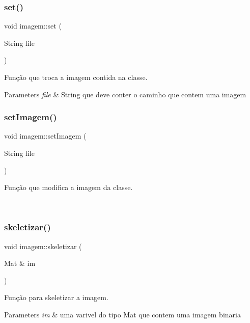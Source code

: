 \subsubsection{\texorpdfstring{set()}{set()}}
{\footnotesize\ttfamily void imagem\+::set (\begin{DoxyParamCaption}\item[{String}]{file }\end{DoxyParamCaption})}



Função que troca a imagem contida na classe. 


\begin{DoxyParams}{Parameters}
{\em file} & String que deve conter o caminho que contem uma imagem \\
\hline
\end{DoxyParams}
\mbox{\label{classimagem_a19ce10f29593d2bb6b7206da49ffb7db}} 
\subsubsection{\texorpdfstring{set\+Imagem()}{setImagem()}}
{\footnotesize\ttfamily void imagem\+::set\+Imagem (\begin{DoxyParamCaption}\item[{String}]{file }\end{DoxyParamCaption})}



Função que modifica a imagem da classe. 

~\newline
 \mbox{\label{classimagem_a9e822c786769377a6eadea8d73437e7a}} 
\subsubsection{\texorpdfstring{skeletizar()}{skeletizar()}}
{\footnotesize\ttfamily void imagem\+::skeletizar (\begin{DoxyParamCaption}\item[{Mat \&}]{im }\end{DoxyParamCaption})}



Função para skeletizar a imagem. 


\begin{DoxyParams}{Parameters}
{\em im} & uma varivel do tipo Mat que contem uma imagem binaria \\
\hline
\end{DoxyParams}
\mbox{\label{classimagem_a4280dd018d44d3d84f4d627f937d3d96}} 
